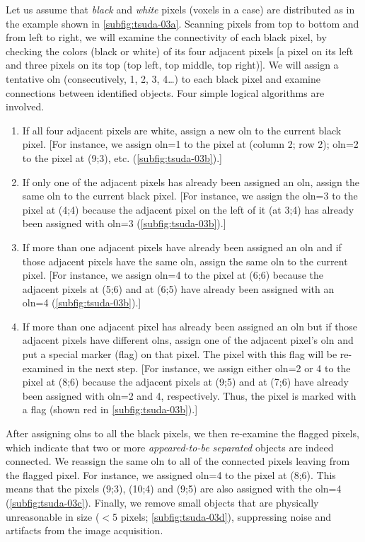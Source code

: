 Let us assume that \emph{black} and \emph{white} pixels (voxels in a \threed case) are distributed as in the example shown in \autoref{subfig:tsuda-03a}. Scanning pixels from top to bottom and from left to right, we will examine the connectivity of each black pixel, by checking the colors (black or white) of its four adjacent pixels [a pixel on its left and three pixels on its top (top left, top middle, top right)]. We will assign a tentative \acf{oln} (consecutively, 1, 2, 3, 4\ldots) to each black pixel and examine connections between identified objects. Four simple logical algorithms are involved.
\begin{enumerate}
	\item If all four adjacent pixels are white, assign a new \ac{oln} to the current black pixel. [For instance, we assign \ac{oln}=1 to the pixel at (column 2; row 2); \ac{oln}=2 to the pixel at (9;3), etc. (\autoref{subfig:tsuda-03b}).]
	\item If only one of the adjacent pixels has already been assigned an \ac{oln}, assign the same \ac{oln} to the current black pixel. [For instance, we assign the \ac{oln}=3 to the pixel at (4;4) because the adjacent pixel on the left of it (at 3;4) has already been assigned with \ac{oln}=3 (\autoref{subfig:tsuda-03b}).]
	\item If more than one adjacent pixels have already been assigned an \ac{oln} and if those adjacent pixels have the same \ac{oln}, assign the same \ac{oln} to the current pixel. [For instance, we assign \ac{oln}=4 to the pixel at (6;6) because the adjacent pixels at (5;6) and at (6;5) have already been assigned with an \ac{oln}=4 (\autoref{subfig:tsuda-03b}).]
	\item If more than one adjacent pixel has already been assigned an \ac{oln} but if those adjacent pixels have different \acp{oln}, assign one of the adjacent pixel's \ac{oln} and put a special marker (flag) on that pixel. The pixel with this flag will be re-examined in the next step. [For instance, we assign either \ac{oln}=2 or 4 to the pixel at (8;6) because the adjacent pixels at (9;5) and at (7;6) have already been assigned with \ac{oln}=2 and 4, respectively. Thus, the pixel is marked with a flag (shown red in \autoref{subfig:tsuda-03b}).]
\end{enumerate}
After assigning \acp{oln} to all the black pixels, we then re-examine the flagged pixels, which indicate that two or more \emph{appeared-to-be separated} objects are indeed connected. We reassign the same \ac{oln} to all of the connected pixels leaving from the flagged pixel. For instance, we assigned \ac{oln}=4 to the pixel at (8;6). This means that the pixels (9;3), (10;4) and (9;5) are also assigned with the \ac{oln}=4 (\autoref{subfig:tsuda-03c}). Finally, we remove small objects that are physically unreasonable in size ($<$5 pixels; \autoref{subfig:tsuda-03d}), suppressing noise and artifacts from the image acquisition.

